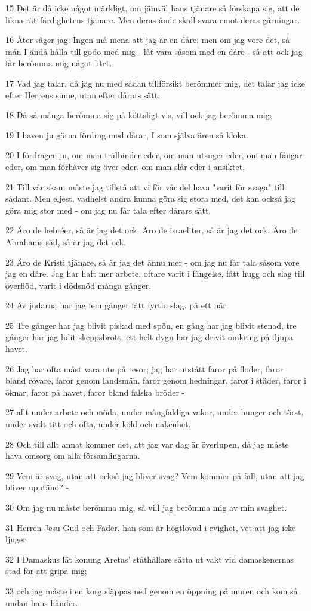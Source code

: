\par 15 Det är då icke något märkligt, om jämväl hans tjänare så förskapa sig, att de likna rättfärdighetens tjänare. Men deras ände skall svara emot deras gärningar.
\par 16 Åter säger jag: Ingen må mena att jag är en dåre; men om jag vore det, så mån I ändå hålla till godo med mig - låt vara såsom med en dåre - så att ock jag får berömma mig något litet.
\par 17 Vad jag talar, då jag nu med sådan tillförsikt berömmer mig, det talar jag icke efter Herrens sinne, utan efter dårars sätt.
\par 18 Då så många berömma sig på köttsligt vis, vill ock jag berömma mig;
\par 19 I haven ju gärna fördrag med dårar, I som själva ären så kloka.
\par 20 I fördragen ju, om man trälbinder eder, om man utsuger eder, om man fångar eder, om man förhäver sig över eder, om man slår eder i ansiktet.
\par 21 Till vår skam måste jag tillstå att vi för vår del hava "varit för svaga" till sådant. Men eljest, vadhelst andra kunna göra sig stora med, det kan också jag göra mig stor med - om jag nu får tala efter dårars sätt.
\par 22 Äro de hebréer, så är jag det ock. Äro de israeliter, så är jag det ock. Äro de Abrahams säd, så är jag det ock.
\par 23 Äro de Kristi tjänare, så är jag det ännu mer - om jag nu får tala såsom vore jag en dåre. Jag har haft mer arbete, oftare varit i fängelse, fått hugg och slag till överflöd, varit i dödsnöd många gånger.
\par 24 Av judarna har jag fem gånger fått fyrtio slag, på ett när.
\par 25 Tre gånger har jag blivit piskad med spön, en gång har jag blivit stenad, tre gånger har jag lidit skeppsbrott, ett helt dygn har jag drivit omkring på djupa havet.
\par 26 Jag har ofta måst vara ute på resor; jag har utstått faror på floder, faror bland rövare, faror genom landsmän, faror genom hedningar, faror i städer, faror i öknar, faror på havet, faror bland falska bröder -
\par 27 allt under arbete och möda, under mångfaldiga vakor, under hunger och törst, under svält titt och ofta, under köld och nakenhet.
\par 28 Och till allt annat kommer det, att jag var dag är överlupen, då jag måste hava omsorg om alla församlingarna.
\par 29 Vem är svag, utan att också jag bliver svag? Vem kommer på fall, utan att jag bliver upptänd? -
\par 30 Om jag nu måste berömma mig, så vill jag berömma mig av min svaghet.
\par 31 Herren Jesu Gud och Fader, han som är högtlovad i evighet, vet att jag icke ljuger.
\par 32 I Damaskus lät konung Aretas' ståthållare sätta ut vakt vid damaskenernas stad för att gripa mig;
\par 33 och jag måste i en korg släppas ned genom en öppning på muren och kom så undan hans händer.

